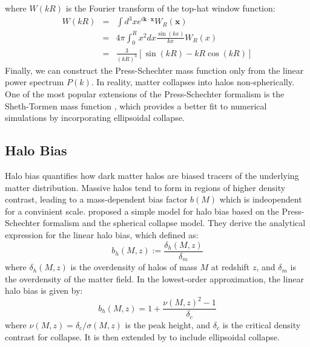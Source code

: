 where $W(kR)$ is the Fourier transform of the top-hat window function:
\begin{eqnarray}
    W(kR) &=& \int d^3 x e^{i\boldsymbol{k} \cdot \boldsymbol{x}} W_R(\boldsymbol{x}) \nonumber \\
    &=& 4\pi \int_0^R x^2 dx \frac{\sin(kx)}{kx} W_R(x) \nonumber \\
    &=& \frac{3}{(kR)^3} \left[ \sin(kR) - kR \cos(kR) \right]
\end{eqnarray}
Finally, we can construct the Press-Schechter mass function only from the linear power spectrum $P(k)$.
In reality, matter collapses into halos non-spherically. One of the most popular extensions of the Press-Schechter formalism is the Sheth-Tormen mass function \citep{1999MNRAS.308..119S}, which provides a better fit to numerical simulations by incorporating ellipsoidal collapse.

\subsection{Halo Bias}
Halo bias quantifies how dark matter halos are biased tracers of the underlying matter distribution. Massive halos tend to form in regions of higher density contrast, leading to a mass-dependent bias factor $b(M)$ which is indeopendent for a convinient scale.
\citet{1996MNRAS.282..347M} proposed a simple model for halo bias based on the Press-Schechter formalism and the spherical collapse model. They derive the analytical expression for the linear halo bias, which defined as:
\begin{equation}
    b_h(M, z) := \frac{\delta_h(M, z)}{\delta_m}
\end{equation}
where $\delta_h(M, z)$ is the overdensity of halos of mass $M$ at redshift $z$, and $\delta_m$ is the overdensity of the matter field. In the lowest-order approximation, the linear halo bias is given by:
\begin{equation}
    b_h(M, z) = 1 + \frac{\nu(M, z)^2 - 1}{\delta_c}
\end{equation}
where $\nu(M, z) = \delta_c / \sigma(M, z)$ is the peak height, and $\delta_c$ is the critical density contrast for collapse. It is then extended by \citet{2001MNRAS.323....1S} to include ellipsoidal collapse.

